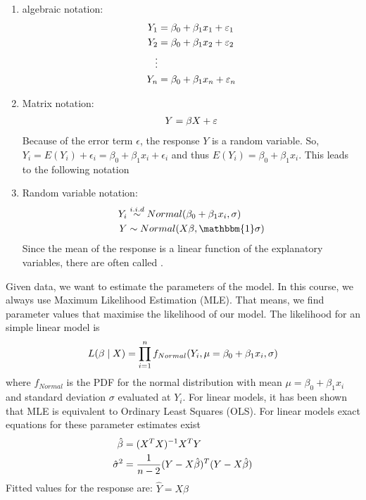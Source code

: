 \begin{definition}
	\begin{enumerate}[label=(\alph*)]
		\item algebraic notation:
		\begin{align}
			Y_1 &= \beta_0 + \beta_1x_1 + \epsilon_1 \notag \\
			Y_2 &= \beta_0 + \beta_1x_2 + \epsilon_2 \notag \\
			\vdots  \notag \\
			Y_n &= \beta_0 + \beta_1x_n + \epsilon_n \notag
		\end{align}
		\item Matrix notation:
		\begin{align}
			Y = \beta X + \epsilon \notag 
		\end{align}
		Because of the error term $\epsilon$, the response $Y$ is a random variable. So, $Y_i = E(Y_i)+\epsilon_i = \beta_0+\beta_1x_i+\epsilon_i$ and thus $E(Y_i) = \beta_0+\beta_1x_i$. This leads to the following notation
		\item Random variable notation: 
		\begin{align}
			Y_i &\overset{i.i.d}{\sim}Normal(\beta_0+\beta_1x_i,\sigma) \notag \\
			Y &\sim Normal(X\beta,\mathbbm{1}\sigma) \notag
		\end{align}
		Since the mean of the response is a linear function of the explanatory variables, there are often called .
	\end{enumerate}
\end{definition}

Given data, we want to estimate the parameters of the model. In this course, we always use Maximum Likelihood Estimation (MLE). That means, we find parameter values that maximise the likelihood of our model. The likelihood for an simple linear model is
\begin{align}
	L(\beta\mid X) = \prod_{i=1}^{n} f_{Normal}(Y_i,\mu=\beta_0+\beta_1x_i,\sigma) \notag
\end{align}
where $f_{Normal}$ is the PDF for the normal distribution with mean $\mu=\beta_0+\beta_1x_i$ and standard deviation $\sigma$ evaluated at $Y_i$. For linear models, it has been shown that MLE is equivalent to Ordinary Least Squares (OLS). For linear models exact equations for these parameter estimates exist
\begin{align}
	\hat{\beta} &= (X^TX)^{-1}X^TY \notag \\
	\hat{\sigma}^2 &= \frac{1}{n-2}(Y-X\hat{\beta})^T(Y-X\hat{\beta})\notag
\end{align}
Fitted values for the response are: $\hat{Y} = X\hat{\beta}$

